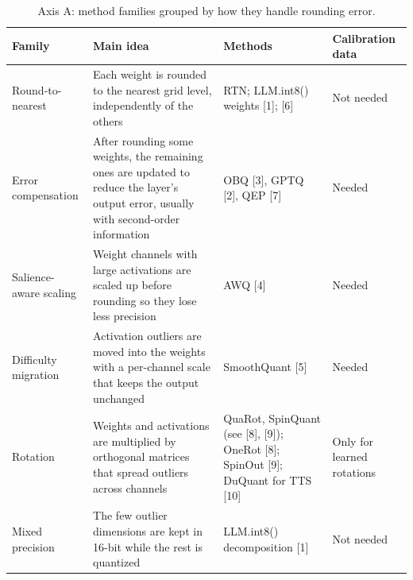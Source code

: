 \documentclass[10pt,twocolumn]{article}
\begin{document}
\begin{table}[t]
\centering
\small
\caption{Axis A: method families grouped by how they handle rounding
error.}
\label{tab:axisA}
\begin{tabularx}{\textwidth}{@{}p{} L p{0.27\textwidth} p{0.13\textwidth}@{}}
\toprule
\textbf{Family} & \textbf{Main idea} & \textbf{Methods} &
\textbf{Calibration data} \\
\midrule
Round-to-nearest & Each weight is rounded to the nearest grid level,
independently of the others & RTN; LLM.int8() weights [1]; [6] & Not
needed \\
Error compensation & After rounding some weights, the remaining ones are
updated to reduce the layer's output error, usually with second-order
information & OBQ [3], GPTQ [2], QEP [7] & Needed \\
Salience-aware scaling & Weight channels with large activations are
scaled up before rounding so they lose less precision & AWQ [4] &
Needed \\
Difficulty migration & Activation outliers are moved into the weights
with a per-channel scale that keeps the output unchanged & SmoothQuant
[5] & Needed \\
Rotation & Weights and activations are multiplied by orthogonal matrices
that spread outliers across channels & QuaRot, SpinQuant (see [8], [9]);
OneRot [8]; SpinOut [9]; DuQuant for TTS [10] & Only for learned
rotations \\
Mixed precision & The few outlier dimensions are kept in 16-bit while
the rest is quantized & LLM.int8() decomposition [1] & Not needed \\
\bottomrule
\end{tabularx}
\end{table}
\end{document}

